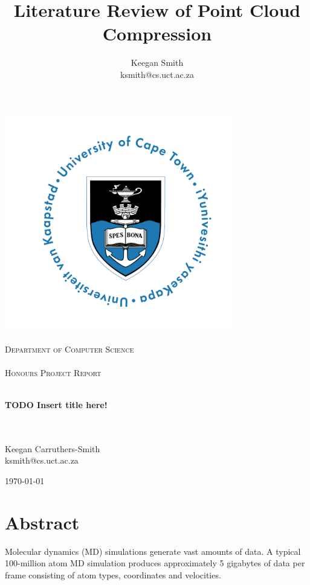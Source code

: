 \documentclass{report}
\title{Literature Review of Point Cloud Compression}
\author{Keegan Smith\\ksmith@cs.uct.ac.za}
\begin{document}
\begin{titlepage}
\begin{center}

\includegraphics[width=100mm]{images/uct}\\
\ \\
\textsc{\Large
Department of Computer Science\\
\ \\
Honours Project Report\\
\ \\}

{\huge \bfseries
TODO Insert title here!
\\}
\ \\
\ \\

\begin{center}
    \large Keegan Carruthers-Smith
    \\
    \small{ksmith@cs.uct.ac.za}
\end{center}

\vfill

{\large \today}

\end{center}
\end{titlepage}


\section*{Abstract}
Molecular dynamics (MD) simulations generate vast amounts of data. A typical
100-million atom MD simulation produces approximately 5 gigabytes of data per
frame consisting of atom types, coordinates and velocities.
\end{document}
